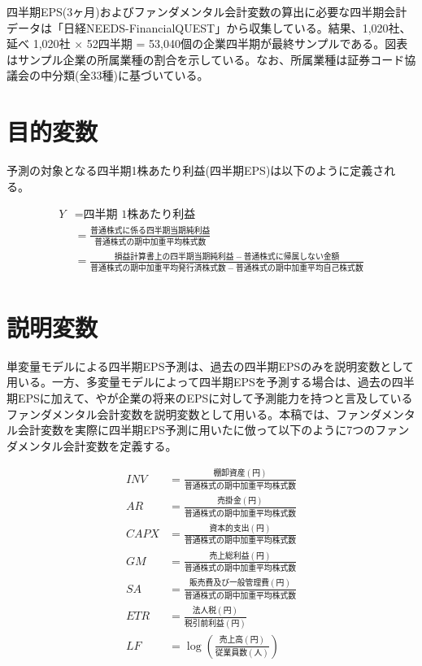 \documentclass[a4paper, 12pt]{jsreport}
\begin{document}
四半期EPS(3ヶ月)およびファンダメンタル会計変数の算出に必要な四半期会計データは「日経NEEDS-FinancialQUEST」から収集している。結果、1,020社、延べ 1,020社 × 52四半期 = 53,040個の企業四半期が最終サンプルである。図表はサンプル企業の所属業種の割合を示している。なお、所属業種は証券コード協議会の中分類(全33種)に基づいている。


\section{目的変数}

予測の対象となる四半期1株あたり利益(四半期EPS)は以下のように定義される。

\begin{equation}
  \begin{split}
    Y &= \text{四半期 1株あたり利益} \\
    &= \frac{普通株式に係る四半期当期純利益}{普通株式の期中加重平均株式数} \\
    &= \frac{損益計算書上の四半期当期純利益-普通株式に帰属しない金額}{普通株式の期中加重平均発行済株式数 - 普通株式の期中加重平均自己株式数} \\  
  \end{split}
\end{equation}

\section{説明変数}

単変量モデルによる四半期EPS予測は、過去の四半期EPSのみを説明変数として用いる。一方、多変量モデルによって四半期EPSを予測する場合は、過去の四半期EPSに加えて、\cite{lev1993fundamental}や\cite{abarbanell1997fundamental}が企業の将来のEPSに対して予測能力を持つと言及しているファンダメンタル会計変数を説明変数として用いる。本稿では、ファンダメンタル会計変数を実際に四半期EPS予測に用いた\cite{zhang2004neural}に倣って以下のように7つのファンダメンタル会計変数を定義する。

\begin{equation}
  \begin{split}
    INV &= \frac{棚卸資産(円)}{普通株式の期中加重平均株式数} \\
    AR &= \frac{売掛金(円)}{普通株式の期中加重平均株式数} \\
    CAPX &= \frac{資本的支出(円)}{普通株式の期中加重平均株式数} \\
    GM &= \frac{売上総利益(円)}{普通株式の期中加重平均株式数} \\
    SA &= \frac{販売費及び一般管理費(円)}{普通株式の期中加重平均株式数} \\
    ETR &= \frac{法人税(円)}{税引前利益(円)} \\
    LF &= \log{\left(\frac{売上高(円)}{従業員数(人)}\right)} \\
  \end{split}
\end{equation}
\end{document}
